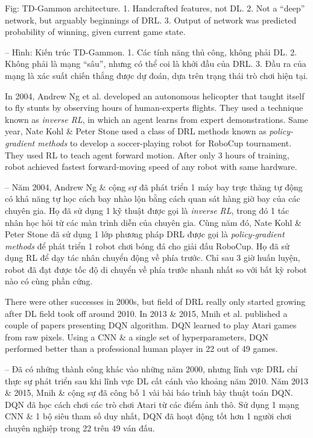\documentclass{article}
\begin{document}
\begin{itemize}
\begin{itemize}
\begin{itemize}
\begin{itemize}
                {\sf Fig: TD-Gammon architecture.} 1. Handcrafted features, not DL. 2. Not a ``deep'' network, but arguably beginnings of DRL. 3. Output of network was predicted probability of winning, given current game state.

                -- {\sf Hình: Kiến trúc TD-Gammon.} 1. Các tính năng thủ công, không phải DL. 2. Không phải là mạng ``sâu'', nhưng có thể coi là khởi đầu của DRL. 3. Đầu ra của mạng là xác suất chiến thắng được dự đoán, dựa trên trạng thái trò chơi hiện tại.

                In 2004, Andrew Ng et al. developed an autonomous helicopter that taught itself to fly stunts by observing hours of human-experts flights. They used a technique known as {\it inverse RL}, in which an agent learns from expert demonstrations. Same year, {\sc Nate Kohl \& Peter Stone} used a class of DRL methods known as {\it policy-gradient methods} to develop a soccer-playing robot for RoboCup tournament. They used RL to teach agent forward motion. After only 3 hours of training, robot achieved fastest forward-moving speed of any robot with same hardware.

                -- Năm 2004, Andrew Ng \& cộng sự đã phát triển 1 máy bay trực thăng tự động có khả năng tự học cách bay nhào lộn bằng cách quan sát hàng giờ bay của các chuyên gia. Họ đã sử dụng 1 kỹ thuật được gọi là {\it inverse RL}, trong đó 1 tác nhân học hỏi từ các màn trình diễn của chuyên gia. Cùng năm đó, {\sc Nate Kohl \& Peter Stone} đã sử dụng 1 lớp phương pháp DRL được gọi là {\it policy-gradient methods} để phát triển 1 robot chơi bóng đá cho giải đấu RoboCup. Họ đã sử dụng RL để dạy tác nhân chuyển động về phía trước. Chỉ sau 3 giờ huấn luyện, robot đã đạt được tốc độ di chuyển về phía trước nhanh nhất so với bất kỳ robot nào có cùng phần cứng.

                There were other successes in 2000s, but field of DRL really only started growing after DL field took off around 2010. In 2013 \& 2015, Mnih et al. published a couple of papers presenting DQN algorithm. DQN learned to play Atari games from raw pixels. Using a CNN \& a single set of hyperparameters, DQN performed better than a professional human player in 22 out of 49 games.

                -- Đã có những thành công khác vào những năm 2000, nhưng lĩnh vực DRL chỉ thực sự phát triển sau khi lĩnh vực DL cất cánh vào khoảng năm 2010. Năm 2013 \& 2015, Mnih \& cộng sự đã công bố 1 vài bài báo trình bày thuật toán DQN. DQN đã học cách chơi các trò chơi Atari từ các điểm ảnh thô. Sử dụng 1 mạng CNN \& 1 bộ siêu tham số duy nhất, DQN đã hoạt động tốt hơn 1 người chơi chuyên nghiệp trong 22 trên 49 ván đấu.


\end{itemize}
\end{itemize}
\end{itemize}
\end{itemize}
\end{document}
